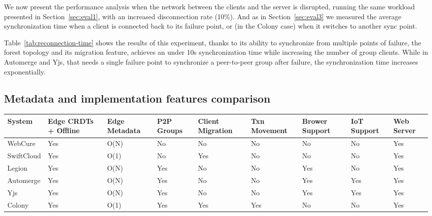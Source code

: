 We now present the performance analysis when the network between the clients 
and the server is disrupted,
running the same workload presented in Section~\ref{sec:eval1},
with an increased disconnection rate (10\%).
And as in Section~\ref{sec:eval3} we measured the average synchronization time
when a client is connected back to its failure point, 
or (in the Colony case) when it switches to another sync point.

Table~\ref{tab:reconnection-time} shows the results of this experiment,
thanks to its ability to synchronize from multiple points of failure,
the forest topology
and its migration feature,
\system{} achieves an under 10s synchronization time while increasing the number
of group clients.
While in Automerge and Yjs, 
that needs a single failure point to synchronize 
a peer-to-peer group after failure,
the synchronization time increases exponentially.

\subsection{Metadata and implementation features comparison}

\begin{center}
    \begin{table}
    \begin{tabular}{ |m{6em}||m{3em}|m{3em}|m{3em}|m{3em}|m{3em}||m{3em}|m{3em}|m{3em}| } 
        \hline
        System & Edge CRDTs + Offline & Edge Metadata & P2P Groups & Client Migration & Txn Movement & Brower Support & IoT Support & Web Server\\ 
        \hline
        WebCure & Yes & O(N) & No & No & No & No & No & Yes \\ 
        \hline
        SwiftCloud & Yes & O(1) & No & Yes & No & No & No & Yes \\ 
        \hline
        Legion & Yes & O(N) & Yes & No & No & Yes & No & Yes \\ 
        \hline
        Automerge & Yes & O(N) & Yes & No & No & Yes & Yes & Yes \\ 
        \hline
        Yjs & Yes & O(N) & Yes & No & No & Yes & Yes & Yes \\ 
        \hline
        Colony & Yes & O(1) & Yes & Yes & Yes & No & No & Yes \\ 
        \hline
    \end{tabular}
\end{table}
\end{center}

